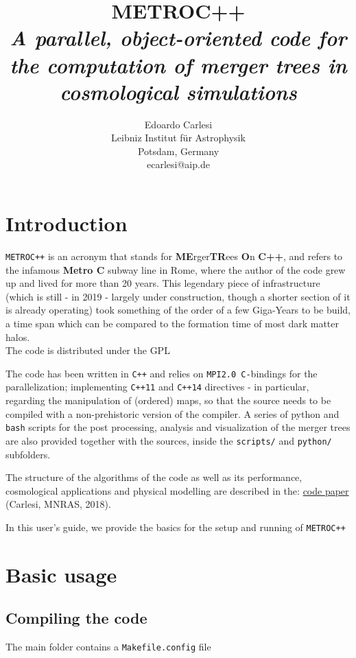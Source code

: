\documentclass{article}
\title{\textbf{METROC++} \\
\emph{A parallel, object-oriented code for the computation of merger trees in 
cosmological simulations}}
\author{Edoardo Carlesi\\ Leibniz Institut f\"ur Astrophysik\\ Potsdam, Germany\\ ecarlesi@aip.de}
\begin{document}
\maketitle
\tableofcontents
\newpage

\section{Introduction}
\texttt{METROC++} is an acronym that stands for \textbf{ME}rger\textbf{TR}ees \textbf{O}n \textbf{C++}, and refers to the 
infamous \textbf{Metro C} subway line in Rome, where the author of the code grew up and lived for more than 20 years.
This legendary piece of infrastructure (which is still - in 2019 - largely under construction, though a shorter section of 
it is already operating) took something of the order of a few Giga-Years to be build, a time span which can be compared to the
formation time of most dark matter halos.\\

The code is distributed under the GPL 

The code has been written in \texttt{C++} and relies on \texttt{MPI2.0 C-}bindings for the parallelization; 
implementing \texttt{C++11} and \texttt{C++14} directives - in particular, regarding the manipulation
of (ordered) maps, so that the source needs to be compiled with a non-prehistoric version of the compiler.
A series of python and \texttt{bash} scripts for the post processing, analysis and visualization of the merger trees are also provided 
together with the sources, inside the \texttt{scripts/} and \texttt{python/} subfolders.

The structure of the algorithms of the code as well as its performance, cosmological applications and 
physical modelling are described in the:
\href{https://arxiv.org/abs/1612.07053}{code paper} (Carlesi, MNRAS, 2018).

In this user's guide, we provide the basics for the setup and running of \texttt{METROC++}


\section{Basic usage}
\subsection{Compiling the code}

The main folder contains a \texttt{Makefile.config} file 
\end{document}
